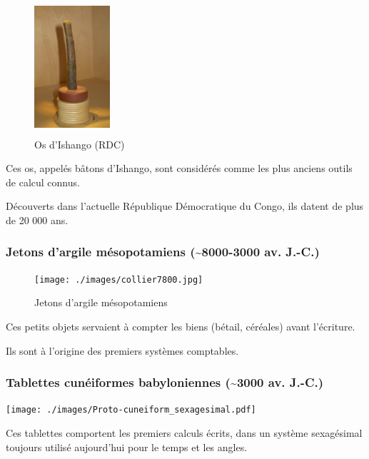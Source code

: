 \documentclass[11pt]{article}
\begin{document}
\begin{figure}[htbp]
\centering
\includegraphics[width=0.25\textwidth,height=5cm]{./images/Os-Ishango.jpeg}
\caption{Os d'Ishango (RDC)}
\end{figure}


Ces os, appelés bâtons d'Ishango, sont considérés comme les plus
anciens outils de calcul connus.

Découverts dans l’actuelle République Démocratique du Congo, ils
datent de plus de 20 000 ans.




\subsubsection{Jetons d’argile mésopotamiens (\textasciitilde{}8000-3000 av. J.-C.)}
\label{sec:org7847ca6}

\begin{figure}[htbp]
\centering
\texttt{[image: ./images/collier7800.jpg]}
\caption{Jetons d’argile mésopotamiens}
\end{figure}



Ces petits objets servaient à compter les biens (bétail, céréales)
avant l’écriture.

Ils sont à l’origine des premiers systèmes comptables.



\subsubsection{Tablettes cunéiformes babyloniennes (\textasciitilde{}3000 av. J.-C.)}
\label{sec:orgdb3bf21}

\begin{center}
\texttt{[image: ./images/Proto-cuneiform\_sexagesimal.pdf]}
\end{center}

Ces tablettes comportent les premiers calculs écrits, dans un système
sexagésimal toujours utilisé aujourd’hui pour le temps et les angles.
\end{document}
